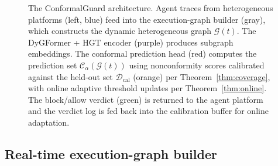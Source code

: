 \documentclass[12pt,a4paper]{article}
\theoremstyle{definition}
\theoremstyle{remark}
\newcommand{\modelname}{ConformalGuard}
\newcommand{\Dcal}{\mathcal{D}}
\newcommand{\Ccal}{\mathcal{C}}
\newcommand{\Gcal}{\mathcal{G}}
\begin{document}
\begin{figure}[!t]
\caption{The \modelname{} architecture. Agent traces from heterogeneous platforms (left, blue) feed into the execution-graph builder (gray), which constructs the dynamic heterogeneous graph $\Gcal(t)$. The DyGFormer + HGT encoder (purple) produces subgraph embeddings. The conformal prediction head (red) computes the prediction set $\Ccal_\alpha(\Gcal(t))$ using nonconformity scores calibrated against the held-out set $\Dcal_{\mathrm{cal}}$ (orange) per Theorem~\ref{thm:coverage}, with online adaptive threshold updates per Theorem~\ref{thm:online}. The block/allow verdict (green) is returned to the agent platform and the verdict log is fed back into the calibration buffer for online adaptation.}
\label{fig:architecture}
\end{figure}

\subsection{Real-time execution-graph builder}
\label{subsec:builder}
\end{document}
